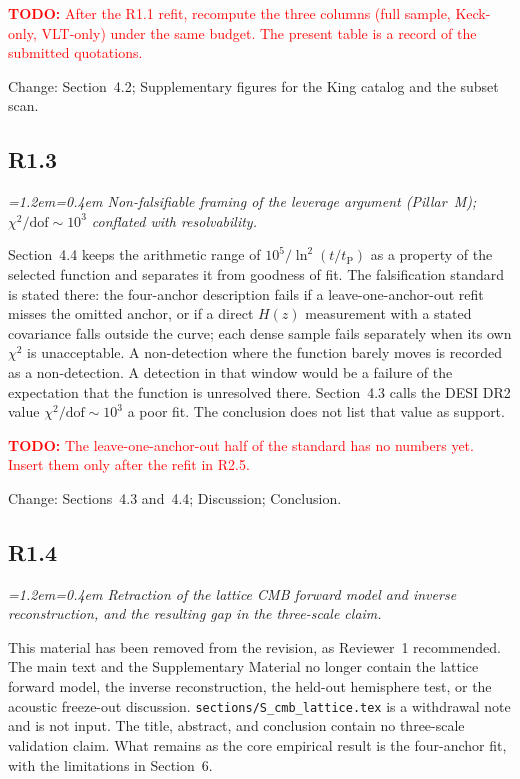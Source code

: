 \documentclass[11pt,a4paper]{article}
\newenvironment{review}{\par\color{revcolor}\itshape\leftskip=1.2em\rightskip=0.4em\noindent}{\par\leftskip=0pt\rightskip=0pt}
\newcommand{\revtodo}[1]{\textcolor{red}{\textbf{TODO:} #1}}
\begin{document}
\revtodo{After the R1.1 refit, recompute the three columns (full sample, Keck-only, VLT-only) under the same budget. The present table is a record of the submitted quotations.}

Change: Section~4.2; Supplementary figures for the King catalog and the subset scan.

\subsection*{R1.3}
\begin{review}
Non-falsifiable framing of the leverage argument (Pillar~M); $\chi^2/\mathrm{dof}\sim 10^{3}$ conflated with resolvability.
\end{review}

Section~4.4 keeps the arithmetic range of $10^{5}/\ln^2(t/t_{\mathrm{P}})$ as a property of the selected function and separates it from goodness of fit.
The falsification standard is stated there: the four-anchor description fails if a leave-one-anchor-out refit misses the omitted anchor, or if a direct $H(z)$ measurement with a stated covariance falls outside the curve; each dense sample fails separately when its own $\chi^2$ is unacceptable.
A non-detection where the function barely moves is recorded as a non-detection.
A detection in that window would be a failure of the expectation that the function is unresolved there.
Section~4.3 calls the DESI DR2 value $\chi^2/\mathrm{dof}\sim 10^{3}$ a poor fit.
The conclusion does not list that value as support.

\revtodo{The leave-one-anchor-out half of the standard has no numbers yet. Insert them only after the refit in R2.5.}

Change: Sections~4.3 and~4.4; Discussion; Conclusion.

\subsection*{R1.4}
\begin{review}
Retraction of the lattice CMB forward model and inverse reconstruction, and the resulting gap in the three-scale claim.
\end{review}

This material has been removed from the revision, as Reviewer~1 recommended.
The main text and the Supplementary Material no longer contain the lattice forward model, the inverse reconstruction, the held-out hemisphere test, or the acoustic freeze-out discussion.
\texttt{sections/S\_cmb\_lattice.tex} is a withdrawal note and is not input.
The title, abstract, and conclusion contain no three-scale validation claim.
What remains as the core empirical result is the four-anchor fit, with the limitations in Section~6.
\end{document}
